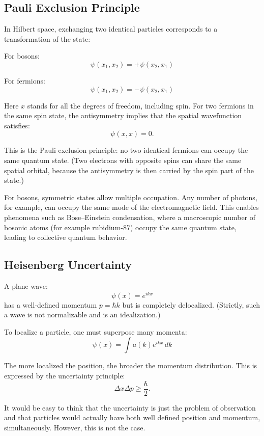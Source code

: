\subsection*{Pauli Exclusion Principle}

In Hilbert space, exchanging two identical particles corresponds to a transformation of the state:

For bosons:
\[
\psi(x_1, x_2) = +\psi(x_2, x_1)
\]

For fermions:
\[
\psi(x_1, x_2) = -\psi(x_2, x_1)
\]

Here $x$ stands for all the degrees of freedom, including spin. For two fermions in the same spin state, the antisymmetry implies that the spatial wavefunction satisfies:
\[
\psi(x,x) = 0 .
\]

This is the Pauli exclusion principle: no two identical fermions can occupy the same quantum state. (Two electrons with opposite spins can share the same spatial orbital, because the antisymmetry is then carried by the spin part of the state.)

For bosons, symmetric states allow multiple occupation. Any number of photons, for example, can occupy the same mode of the electromagnetic field. 
This enables phenomena such as Bose--Einstein condensation, where a macroscopic number of bosonic atoms (for example rubidium-87) occupy the same quantum state, leading to collective quantum behavior.


\subsection*{Heisenberg Uncertainty}

A plane wave:
\[
\psi(x) = e^{ikx}
\]
has a well-defined momentum $p=\hbar k$ but is completely delocalized. (Strictly, such a wave is not normalizable and is an idealization.)

To localize a particle, one must superpose many momenta:
\[
\psi(x) = \int a(k) e^{ikx} \, dk
\]

The more localized the position, the broader the momentum distribution. This is expressed by the uncertainty principle:
\[
\Delta x \Delta p \ge \frac{\hbar}{2}.
\]

It would be easy to think that the uncertainty is just the problem of observation and that particles would actually have both well defined position and momentum, simultaneously. 
However, this is not the case.

